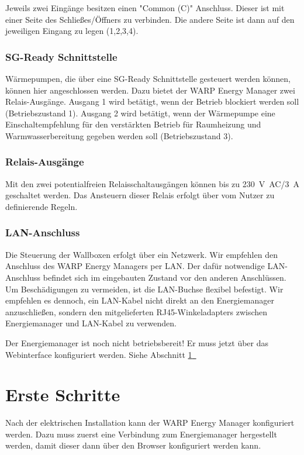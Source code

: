 \documentclass[a4paper,10pt]{article}
\newcommand{\hint}[1]{\begin{tcolorbox}[colback=boxgray,colframe=black,coltext=
white,title=Hinweis,left*=2mm,right*=2mm,boxsep=1mm,bottom=1mm,top=1mm]#1\end{tcolorbox}}
\newcommand*{\fullref}[1]{Abschnitt \hyperref[{#1}]{\ref*{#1}~\nameref*{#1}}}
\begin{document}
\begin{multicols*}{2}
    Jeweils zwei Eingänge besitzen einen "Common (C)" Anschluss. Dieser ist mit einer Seite des Schließes/Öffners
    zu verbinden. Die andere Seite ist dann auf den jeweiligen Eingang zu legen (1,2,3,4).

	\subsubsection{SG-Ready Schnittstelle}
    Wärmepumpen, die über eine SG-Ready Schnittstelle gesteuert werden können, können hier angeschlossen werden.
    Dazu bietet der WARP Energy Manager zwei Relais-Ausgänge. 
    Ausgang 1 wird betätigt, wenn der Betrieb blockiert werden soll (Betriebszustand 1).
    Ausgang 2 wird betätigt, wenn der Wärmepumpe eine Einschaltempfehlung für den verstärkten Betrieb 
    für Raumheizung und Warmwasserbereitung gegeben werden soll (Betriebszustand 3).

	\subsubsection{Relais-Ausgänge}
	Mit den zwei potentialfreien Relaisschaltausgängen können bis zu \SI{230}{\volt AC}/\SI{3}{\ampere} geschaltet
	werden. Das Ansteuern dieser Relais erfolgt über vom Nutzer zu definierende Regeln.

	\subsubsection{LAN-Anschluss}
	Die Steuerung der Wallboxen erfolgt über ein Netzwerk. Wir empfehlen den
	Anschluss des WARP Energy Managers per LAN. Der dafür notwendige LAN-Anschluss
	befindet sich im eingebauten Zustand vor den anderen Anschlüssen. Um Beschädigungen
	zu vermeiden, ist die LAN-Buchse flexibel befestigt. Wir empfehlen es dennoch, ein LAN-Kabel
	nicht direkt an den Energiemanager anzuschließen, sondern den mitgelieferten RJ45-Winkeladapters zwischen Energiemanager und LAN-Kabel zu verwenden.

	\hint{Der Energiemanager ist noch nicht betriebsbereit! Er muss jetzt über das Webinterface konfiguriert werden. Siehe \fullref{setup}}

	\vfill
	\null
	\newpage
	\section{Erste Schritte}
	\label{setup}

	Nach der elektrischen Installation kann der WARP Energy Manager konfiguriert
	werden. Dazu muss zuerst eine Verbindung zum Energiemanager hergestellt werden,
	damit dieser dann über den Browser konfiguriert werden kann.


\end{multicols*}
\end{document}
